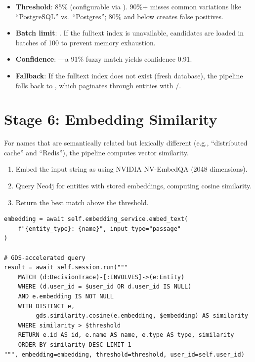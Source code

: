 \begin{itemize}
    \item \textbf{Threshold}: 85\% (configurable via
          ).  90\%+ misses common
          variations like ``PostgreSQL'' vs.\ ``Postgres'';
          80\% and below creates false positives.
    \item \textbf{Batch limit}: .  If the
          fulltext index is unavailable, candidates are loaded in batches
          of 100 to prevent memory exhaustion.
    \item \textbf{Confidence}: ---a 91\% fuzzy match
          yields confidence 0.91.
    \item \textbf{Fallback}: If the fulltext index does not exist (fresh
          database), the pipeline falls back to
          , which paginates through
          entities with /.
\end{itemize}


\section{Stage 6: Embedding Similarity}
\label{sec:er-embedding}

For names that are semantically related but lexically different (e.g.,
``distributed cache'' and ``Redis''), the pipeline computes vector
similarity.

\begin{enumerate}
    \item Embed the input string as  using
          NVIDIA NV-EmbedQA (2048 dimensions).
    \item Query Neo4j for entities with stored embeddings, computing
          cosine similarity.
    \item Return the best match above the threshold.
\end{enumerate}

\begin{lstlisting}[style=python, caption={Embedding similarity (GDS path).}]
embedding = await self.embedding_service.embed_text(
    f"{entity_type}: {name}", input_type="passage"
)

# GDS-accelerated query
result = await self.session.run("""
    MATCH (d:DecisionTrace)-[:INVOLVES]->(e:Entity)
    WHERE (d.user_id = $user_id OR d.user_id IS NULL)
    AND e.embedding IS NOT NULL
    WITH DISTINCT e,
         gds.similarity.cosine(e.embedding, $embedding) AS similarity
    WHERE similarity > $threshold
    RETURN e.id AS id, e.name AS name, e.type AS type, similarity
    ORDER BY similarity DESC LIMIT 1
""", embedding=embedding, threshold=threshold, user_id=self.user_id)
\end{lstlisting}

